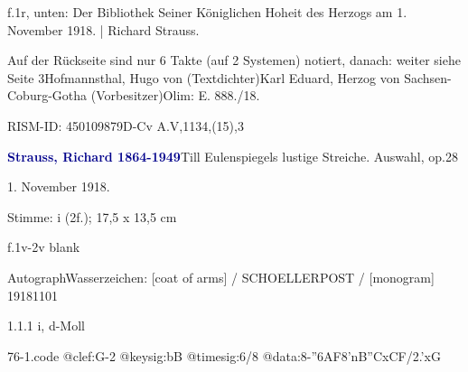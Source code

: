 \documentclass[a4paper, twocolumn, 11pt]{book}
\begin{document}
\newline %
\par f.1r, unten: {\textquotedbl}Der Bibliothek Seiner Königlichen Hoheit des Herzogs am 1. November 1918. | Richard Strauss.{\textquotedbl}
\par Auf der Rückseite sind nur 6 Takte (auf 2 Systemen) notiert, danach: {\textquotedbl}weiter siehe Seite 3{\textquotedbl}\newline Hofmannsthal, Hugo von  (Textdichter)\newline Karl Eduard, Herzog von Sachsen-Coburg-Gotha  (Vorbesitzer)\newline Olim: E. 888./18.
\par RISM-ID: 450109879\newline D-Cv  A.V,1134,(15),3
\par \vspace{16pt} \textcolor{darkblue}{\textbf{Strauss, Richard  1864-1949}}\hfillplus{[76]}\newline Till Eulenspiegels lustige Streiche. Auswahl, op.28
\par \begin{itshape}[heading:] 1. November 1918.\end{itshape} 
\par \textcolor{darkblue}{}  Stimme: i  (2f.); 17,5 x 13,5 cm\newline \begin{small} f.1v-2v blank\end{small} \newline Autograph\newline Wasserzeichen: [coat of arms] / SCHOELLERPOST / [monogram]  19181101
\par 1.1.1  i, d-Moll  
\begin{filecontents*}{76-1.code}
@clef:G-2
@keysig:bB
@timesig:6/8
@data:8-{''6AF8'nB}{''CxCF}/2.'xG
\end{filecontents*}
\end{document}
